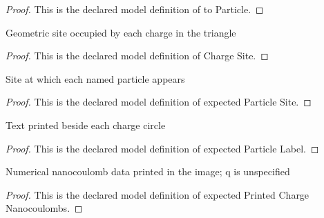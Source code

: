\begin{proof}
  This is the declared model definition of to Particle.
\end{proof}
\begin{definition}
  \label{def:physics:phyx-mini-0907:phyxminiproblems-problemphyxmini0907-chargesite}
  Geometric site occupied by each charge in the triangle
\end{definition}
\begin{proof}
  This is the declared model definition of Charge Site.
\end{proof}
\begin{definition}
  \label{def:physics:phyx-mini-0907:phyxminiproblems-problemphyxmini0907-expectedparticlesite}
  Site at which each named particle appears
\end{definition}
\begin{proof}
  This is the declared model definition of expected Particle Site.
\end{proof}
\begin{definition}
  \label{def:physics:phyx-mini-0907:phyxminiproblems-problemphyxmini0907-expectedparticlelabel}
  Text printed beside each charge circle
\end{definition}
\begin{proof}
  This is the declared model definition of expected Particle Label.
\end{proof}
\begin{definition}
  \label{def:physics:phyx-mini-0907:phyxminiproblems-problemphyxmini0907-expectedprintedchargenanocoulombs}
  Numerical nanocoulomb data printed in the image; q is unspecified
\end{definition}
\begin{proof}
  This is the declared model definition of expected Printed Charge Nanocoulombs.
\end{proof}
